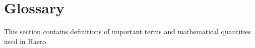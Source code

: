 \section{Glossary}

This section contains definitions of important terms and mathematical quantities
used in Haero.

